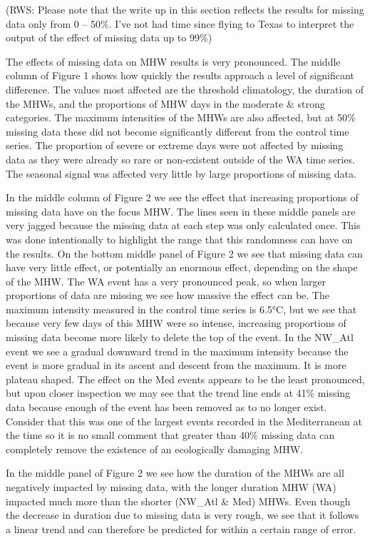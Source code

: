 \documentclass[]{article}
\begin{document}
(RWS: Please note that the write up in this section reflects the results
for missing data only from 0 -- 50\%. I've not had time since flying to
Texas to interpret the output of the effect of missing data up to 99\%)

The effects of missing data on MHW results is very pronounced. The
middle column of Figure 1 shows how quickly the results approach a level
of significant difference. The values most affected are the threshold
climatology, the duration of the MHWs, and the proportions of MHW days
in the moderate \& strong categories. The maximum intensities of the
MHWs are also affected, but at 50\% missing data these did not become
significantly different from the control time series. The proportion of
severe or extreme days were not affected by missing data as they were
already so rare or non-existent outside of the WA time series. The
seasonal signal was affected very little by large proportions of missing
data.

In the middle column of Figure 2 we see the effect that increasing
proportions of missing data have on the focus MHW. The lines seen in
these middle panels are very jagged because the missing data at each
step was only calculated once. This was done intentionally to highlight
the range that this randomness can have on the results. On the bottom
middle panel of Figure 2 we see that missing data can have very little
effect, or potentially an enormous effect, depending on the shape of the
MHW. The WA event has a very pronounced peak, so when larger proportions
of data are missing we see how massive the effect can be. The maximum
intensity measured in the control time series is 6.5°C, but we see that
because very few days of this MHW were so intense, increasing
proportions of missing data become more likely to delete the top of the
event. In the NW\_Atl event we see a gradual downward trend in the
maximum intensity because the event is more gradual in its ascent and
descent from the maximum. It is more plateau shaped. The effect on the
Med events appears to be the least pronounced, but upon closer
inspection we may see that the trend line ends at 41\% missing data
because enough of the event has been removed as to no longer exist.
Consider that this was one of the largest events recorded in the
Mediterranean at the time so it is no small comment that greater than
40\% missing data can completely remove the existence of an ecologically
damaging MHW.

In the middle panel of Figure 2 we see how the duration of the MHWs are
all negatively impacted by missing data, with the longer duration MHW
(WA) impacted much more than the shorter (NW\_Atl \& Med) MHWs. Even
though the decrease in duration due to missing data is very rough, we
see that it follows a linear trend and can therefore be predicted for
within a certain range of error.
\end{document}
